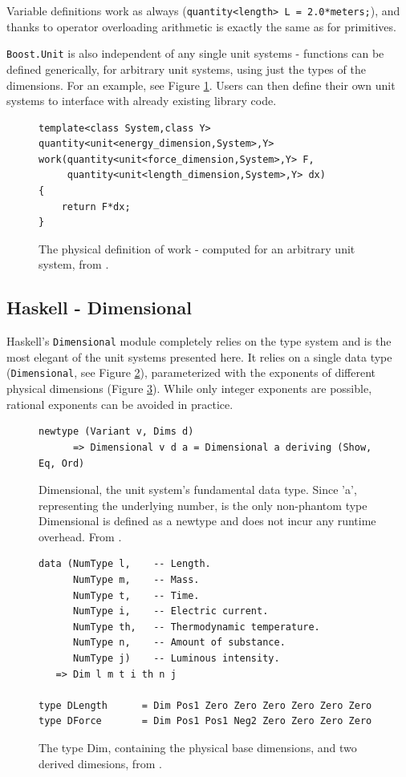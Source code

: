 \documentclass[12pt,oneside,a4paper]{scrbook}
\theoremstyle{definition}
\begin{document}
Variable definitions work as always (\verb/quantity<length> L = 2.0*meters;/), and thanks to operator overloading arithmetic is exactly the same as for primitives.

\verb/Boost.Unit/ is also independent of any single unit systems - functions can be defined generically, for arbitrary unit systems, using just the types of the dimensions. For an example, see Figure \ref{code:boost_units_generic}. Users can then define their own unit systems to interface with already existing library code.

\begin{figure}
\begin{verbatim}
template<class System,class Y>
quantity<unit<energy_dimension,System>,Y>
work(quantity<unit<force_dimension,System>,Y> F,
     quantity<unit<length_dimension,System>,Y> dx)
{
    return F*dx;
}
\end{verbatim}
\caption{The physical definition of work - computed for an arbitrary unit system, from \citep{Schabel10}.}
\label{code:boost_units_generic}
\end{figure}


\subsection{Haskell - Dimensional}
Haskell's \verb/Dimensional/ module \citep{Buckwalter06} completely relies on the type system and is the most elegant of the unit systems presented here. It relies on a single data type (\verb/Dimensional/, see Figure \ref{code:haskell_dimensional}), parameterized with the exponents of different physical dimensions (Figure \ref{code:haskell_dim}). While only integer exponents are possible, rational exponents can be avoided in practice.

\begin{figure}
\begin{verbatim}
newtype (Variant v, Dims d)
      => Dimensional v d a = Dimensional a deriving (Show, Eq, Ord)
\end{verbatim}
\caption{Dimensional, the unit system's fundamental data type. Since 'a', representing the underlying number, is the only non-phantom type Dimensional is defined as a newtype and does not incur any runtime overhead. From \citep{Buckwalter06}.}
\label{code:haskell_dimensional}
\end{figure}



\begin{figure}
\begin{verbatim}
data (NumType l,    -- Length.
      NumType m,    -- Mass.
      NumType t,    -- Time.
      NumType i,    -- Electric current.
      NumType th,   -- Thermodynamic temperature.
      NumType n,    -- Amount of substance.
      NumType j)    -- Luminous intensity.
   => Dim l m t i th n j

type DLength      = Dim Pos1 Zero Zero Zero Zero Zero Zero
type DForce       = Dim Pos1 Pos1 Neg2 Zero Zero Zero Zero
\end{verbatim}
\caption{The type Dim, containing the physical base dimensions, and two derived dimesions, from \citep{Buckwalter06}.}
\label{code:haskell_dim}
\end{figure}
\end{document}
